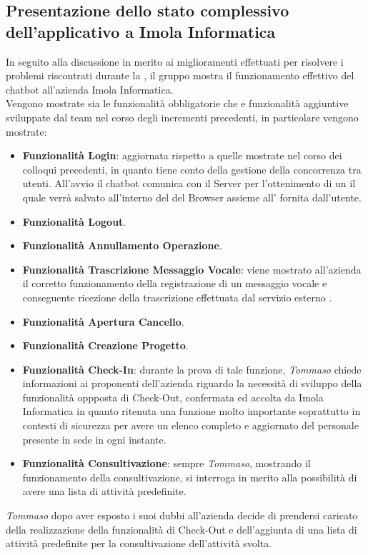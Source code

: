 \newpage
\subsection{Presentazione dello stato complessivo     dell'applicativo a Imola Informatica}
In seguito alla discussione in merito ai miglioramenti effettuati per risolvere i problemi riscontrati durante la ,
il gruppo mostra il funzionamento effettivo del chatbot all'azienda Imola Informatica. \\
Vengono mostrate sia le funzionalità obbligatorie che e funzionalità aggiuntive sviluppate dal team nel corso degli incrementi precedenti, 
in particolare vengono mostrate: 
\begin{itemize}
    \item \textbf{Funzionalità Login}: aggiornata rispetto a quelle mostrate nel corso dei colloqui precedenti, in quanto tiene conto della gestione della concorrenza tra utenti. All'avvio il chatbot comunica con il Server per l'ottenimento di un  il quale verrà salvato all'interno del  del Browser assieme all' fornita dall'utente. 
    \item \textbf{Funzionalità Logout}.
    \item \textbf{Funzionalità Annullamento Operazione}.
    \item \textbf{Funzionalità Trascrizione Messaggio Vocale}: viene mostrato all'azienda il corretto funzionamento della registrazione di un messaggio vocale e conseguente ricezione della trascrizione effettuata dal servizio esterno .
    \item \textbf{Funzionalità Apertura Cancello}.
    \item \textbf{Funzionalità Creazione Progetto}.
    \item \textbf{Funzionalità Check-In}: durante la prova di tale funzione, \textit{Tommaso} chiede informazioni ai proponenti dell'azienda riguardo la necessità 
    di sviluppo della funzionalità oppposta di Check-Out, confermata ed accolta da Imola Informatica in quanto ritenuta una funzione molto importante soprattutto in contesti di sicurezza per avere un elenco completo e aggiornato del personale presente in sede in ogni instante. 
    \item \textbf{Funzionalità Consultivazione}: sempre \textit{Tommaso}, mostrando il funzionamento della consultivazione, si interroga in merito alla possibilità di avere una lista di attività predefinite. 
\end{itemize}
\textit{Tommaso} dopo aver esposto i suoi dubbi all'azienda decide di prendersi caricato della realizzazione della funzionalità di Check-Out e dell'aggiunta di una lista di attività predefinite per la consultivazione dell'attività svolta.

